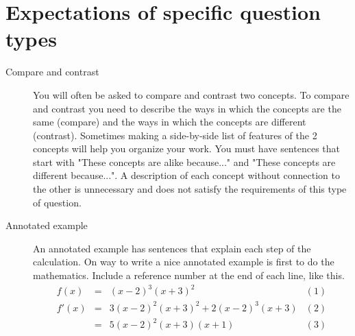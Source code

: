   \section{ Expectations of specific question types}

\begin{description}
\item[Compare and contrast] You will often be asked to compare and contrast two 
concepts.  To compare and contrast you need to describe the ways in which the 
concepts are the same (compare) and the ways in which the concepts are different 
(contrast).  Sometimes making a side-by-side list of features of the 2 concepts 
will help you organize your work. You must have sentences that start with 
"These concepts are alike because..." and "These concepts are different because...".  A description of each concept without connection to the other is unnecessary and does not satisfy the requirements of this type of question.  
\item[Annotated example]  An annotated example has sentences that explain each step of the calculation.  On way to write a nice annotated example is first to do the mathematics.  Include a reference number at the end of each line, like this.
 $$\begin{array}{rclr}
  f(x)& = &\left( {x - 2} \right)^3 \left( {x + 3} \right)^2  & (1) \\ 
  f'(x)& =& 3\left( {x - 2} \right)^2 \left( {x + 3} \right)^2  + 2\left( {x - 2} \right)^3 \left( {x + 3} \right) & (2) \\ 
   &= &5\left( {x - 2} \right)^2 \left( {x + 3} \right)\left( {x + 1} \right) &  (3) 
\end{array} 
$$


\end{description}
